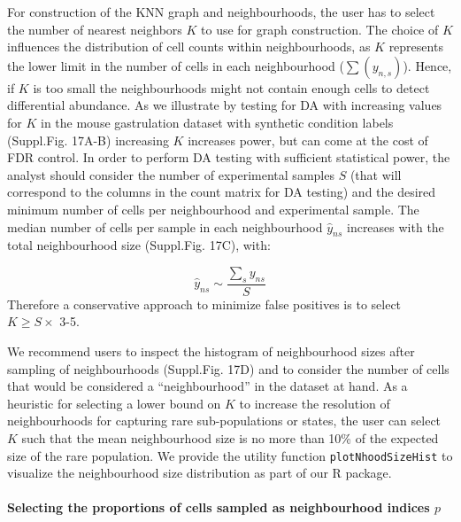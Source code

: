 \documentclass[
]{article}
\begin{document}
For construction of the KNN graph and neighbourhoods, the user has to select the number of nearest neighbors \(K\) to use for graph construction.
The choice of \(K\) influences the distribution of cell counts within neighbourhoods, as \(K\) represents the lower limit in the number of cells in each neighbourhood (\(\sum(y_{n,s})\)). Hence, if \(K\) is too small the neighbourhoods might not contain enough cells to detect differential abundance. As we illustrate by testing for DA with increasing values for \(K\) in the mouse gastrulation dataset with synthetic condition labels (Suppl.Fig. 17A-B) increasing \(K\) increases power, but can come at the cost of FDR control.
In order to perform DA testing with sufficient statistical power, the analyst should consider the number of experimental samples \(S\) (that will correspond to the columns in the count matrix for DA testing) and the desired minimum number of cells per neighbourhood and experimental sample.
The median number of cells per sample in each neighbourhood \(\hat{y}_{ns}\) increases with the total neighbourhood size (Suppl.Fig. 17C), with:

\[
\hat{y}_{ns} \sim \frac{\sum_s y_{ns}}{S}
\]
Therefore a conservative approach to minimize false positives is to select \(K \geq S \times\) 3-5.

We recommend users to inspect the histogram of neighbourhood sizes after sampling of neighbourhoods (Suppl.Fig. 17D) and to consider the number of cells that would be considered a ``neighbourhood'' in the dataset at hand. As a heuristic for selecting a lower bound on \(K\) to increase the resolution of neighbourhoods for capturing rare sub-populations or states, the user can select \(K\) such that the mean neighbourhood size is no more than 10\% of the expected size of the rare population. We provide the utility function
\texttt{plotNhoodSizeHist} to visualize the neighbourhood size distribution as part of our R package.

\hypertarget{selecting-the-proportions-of-cells-sampled-as-neighbourhood-indices-p}{%
\paragraph*{\texorpdfstring{Selecting the proportions of cells sampled as neighbourhood indices \(p\)}{Selecting the proportions of cells sampled as neighbourhood indices p}}\label{selecting-the-proportions-of-cells-sampled-as-neighbourhood-indices-p}}
\end{document}
